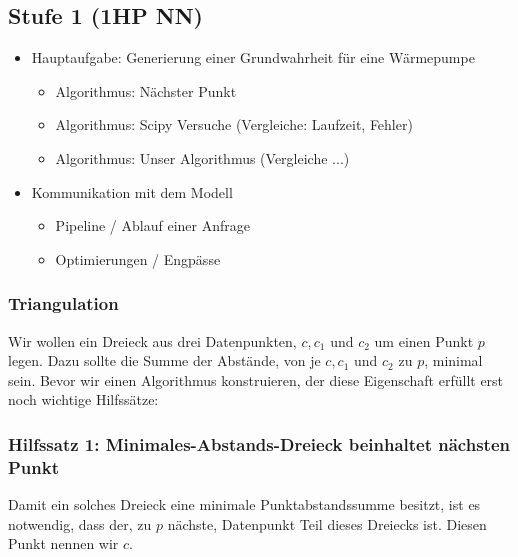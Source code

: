 \documentclass[a4paper]{extarticle}
\begin{document}
    \subsection{Stufe 1 (1HP NN)}
    \begin{itemize}
        \item Hauptaufgabe: Generierung einer Grundwahrheit für eine Wärmepumpe
        \begin{itemize}
            \item Algorithmus: Nächster Punkt
            \item Algorithmus: Scipy Versuche (Vergleiche: Laufzeit, Fehler)
            \item Algorithmus: Unser Algorithmus (Vergleiche ...)
        \end{itemize}
        \item Kommunikation mit dem Modell
        \begin{itemize}
            \item Pipeline / Ablauf einer Anfrage
            \item Optimierungen / Engpässe
        \end{itemize}
    \end{itemize}
    \subsubsection{Triangulation}
    
    Wir wollen ein Dreieck aus drei Datenpunkten, $c, c_1$ und $c_2$ um einen Punkt $p$ legen.
    Dazu sollte die Summe der Abstände, von je $c, c_1$ und $c_2$ zu $p$, minimal sein.
    Bevor wir einen Algorithmus konstruieren, der diese Eigenschaft erfüllt erst noch wichtige
    Hilfssätze:

    \subsubsection{Hilfssatz 1: Minimales-Abstands-Dreieck beinhaltet nächsten Punkt}
    Damit ein solches Dreieck eine minimale Punktabstandssumme besitzt,
    ist es notwendig, dass der, zu $p$ nächste, Datenpunkt Teil dieses Dreiecks ist. Diesen Punkt 
    nennen wir $c$.
\end{document}
